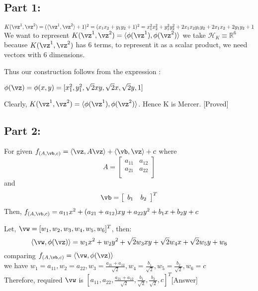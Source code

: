 \documentclass[a4paper,11pt]{article}
\begin{document}
\begin{mlsolution}
\subsection*{Part 1:}
$K(\vz^1,\vz^2) = (\langle\vz^1,\vz^2\rangle + 1)^2 = (x_1x_2 + y_1y_2 + 1)^2 = x_1^2x_2^2 + y_1^2y_2^2 + 2x_1x_2y_1y_2 + 2x_1x_2 + 2y_1y_2 + 1$\\

We want to represent $K(\vz^1,\vz^2) = \langle\phi(\vz^1),\phi(\vz^2)\rangle $ we take $\mathcal{H}_K \equiv{\mathbb{R}^6}$ because $K(\vz^1,\vz^2) $ has 6 terms, to represent it as a scalar product, we need vectors with 6 dimensions.

Thus our construction follows from the expression :

\begin{center}
$\phi(\vz)=\phi(x,y)=[x_1^2,y_1^2,\sqrt{2}xy,\sqrt{2}x,\sqrt{2}y,1]$ 
\end{center}
Clearly,  $K(\vz^1,\vz^2) = \langle\phi(\vz^1),\phi(\vz^2)\rangle $. Hence K is Mercer. [Proved]
\subsection*{Part 2:}
For given $f_{(A,\vb,c)} = \langle\vz,A\vz\rangle + \langle\vb,\vz\rangle + c$ where \[
   A=
  \left[ {\begin{array}{cc}
   a_{11} & a_{12} \\
   a_{21} & a_{22} \\
  \end{array} } \right]
\]and \[\vb =  \left[ {\begin{array}{cc}
   b_1 & b_2 \\
  \end{array} } \right]^T
  \]
  Then, $f_{(A,\vb,c)} = a_{11}x^2 + (a_{21} + a_{12})xy + a_{22}y^2 + b_1x + b_2y + c$
  
  Let, $\vw=[w_1,w_2,w_3,w_4,w_5,w_6]^T$, then: $$\langle\vw,\phi(\vz)\rangle = w_1x^2 + w_2y^2 + \sqrt{2}w_3xy +\sqrt{2} w_4x +\sqrt{2} w_5y + w_6$$ 
  comparing $f_{(A,\vb,c)} = \langle\vw,\phi(\vz)\rangle$ \\
  we have $w_1 = a_{11},w_2 = a_{22},w_3 = \frac{a_{21} + a_{12}}{\sqrt{2}}, w_4 = \frac{b_1}{\sqrt{2}},w_5 = \frac{b_2}{\sqrt{2}},w_6 = c$\\
  
  Therefore, required $\vw$ is $[a_{11},a_{22},\frac{a_{21} + a_{12}}{\sqrt{2}},\frac{b_1}{\sqrt{2}},\frac{b_2}{\sqrt{2}},c]^T$[Answer]


\end{mlsolution}
\end{document}
